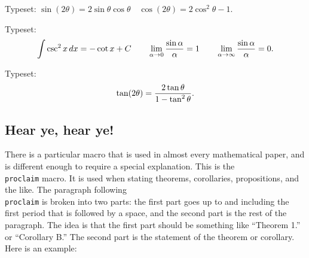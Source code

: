  
 
\exercise Typeset: $\sin(2\theta) = 2\sin\theta\cos\theta \quad 
\cos(2\theta) = 2\cos^2\theta - 1  $. 
 
\exercise Typeset: $$\int \csc^2x\, dx = -\cot x+ C 
\qquad \lim_{\alpha\to 0} {\sin\alpha \over \alpha} = 1 
\qquad \lim_{\alpha\to \infty} {\sin\alpha \over \alpha} = 0.$$ 
 
\exercise Typeset: $$\tan(2\theta) = {2\tan\theta \over 
1-\tan^2\theta}.$$ 
 
 
\subsection{Hear ye, hear ye!} 
 
There is a particular macro that is used in almost every 
mathematical paper, and is different enough to require a special 
explanation. This is the {\tt \\proclaim} macro.  It is used when 
stating theorems, corollaries, propositions, and the like.  The 
paragraph following {\tt \\proclaim} is broken into two parts: 
the first part goes up to and including the first period that is 
followed by a space, and the second part is the rest of the 
paragraph. The idea is that the first part 
should be something like ``Theorem 1.'' or ``Corollary B.'' The 
second part is the statement of the theorem or corollary.  Here 
is an example: 
 
